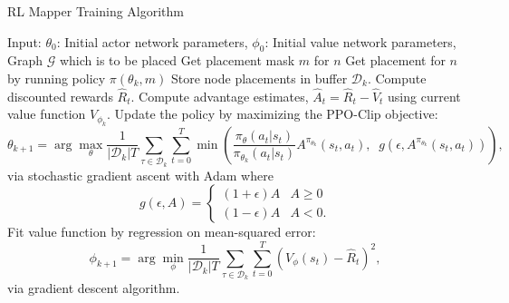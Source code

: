 \begin{algorithm*}
  \caption{RL Mapper Training Algorithm}
  \label{alg1}
\begin{algorithmic}[1]
  \STATE Input: $\theta_0$: Initial actor network parameters, $\phi_0$: Initial value network parameters, Graph $\mathcal{G}$ which is to be placed
    \STATE Get placement mask $m$ for $n$
    \STATE Get placement for $n$ by running policy $\pi(\theta_k, m)$
    \STATE Store node placements in buffer ${\mathcal D}_k$.
  \ENDFOR
  \ENDFOR
  \STATE Compute discounted rewards $\hat{R}_t$.
  \STATE Compute advantage estimates, $\hat{A}_t = \hat{R}_t - \hat{V}_t$ using current value function $V_{\phi_k}$.
  \STATE Update the policy by maximizing the PPO-Clip objective:
      \begin{equation*}
        \theta_{k+1} = \arg \max_{\theta} \frac{1}{|{\mathcal D}_k| T} \sum_{\tau \in {\mathcal D}_k} \sum_{t=0}^T \min\left(
            \frac{\pi_{\theta}(a_t|s_t)}{\pi_{\theta_k}(a_t|s_t)}  A^{\pi_{\theta_k}}(s_t,a_t), \;\;
            g(\epsilon, A^{\pi_{\theta_k}}(s_t,a_t))
        \right),
      \end{equation*}
      via stochastic gradient ascent with Adam where
      \begin{equation*}
        g(\epsilon, A) = \left\{ 
          \begin{array}{ll}
          (1 + \epsilon) A & A \geq 0 \\
          (1 - \epsilon) A & A < 0.
          \end{array}
          \right.
      \end{equation*}
  \STATE Fit value function by regression on mean-squared error:
      \begin{equation*}
      \phi_{k+1} = \arg \min_{\phi} \frac{1}{|{\mathcal D}_k| T} \sum_{\tau \in {\mathcal D}_k} \sum_{t=0}^T\left( V_{\phi} (s_t) - \hat{R}_t \right)^2,
      \end{equation*}
      via gradient descent algorithm.
  \ENDFOR
\end{algorithmic}
\end{algorithm*}
